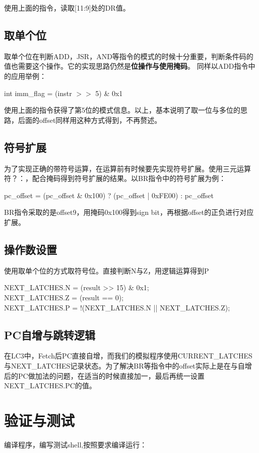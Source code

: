 \documentclass[UTF8]{ctexart}
\begin{document}
使用上面的指令，读取[11:9]处的DR值。

\subsection{取单个位}
取单个位在判断ADD，JSR，AND等指令的模式的时候十分重要，判断条件码的值也需要这个操作。它的实现思路仍然是\textbf{位操作与使用掩码}。
同样以ADD指令中的应用举例：

{\centering int imm\_flag = (instr $>>$ 5) \& 0x1 \par}

使用上面的指令获得了第5位的模式信息。以上，基本说明了取一位与多位的思路，后面的offset同样用这种方式得到，不再赘述。

\subsection{符号扩展}
为了实现正确的带符号运算，在运算前有时候要先实现符号扩展。使用三元运算符？：，配合掩码得到符号扩展的结果。以BR指令中的符号扩展为例：

{\centering  pc\_offset = (pc\_offset \& 0x100) ? (pc\_offset | 0xFE00) : pc\_offset \par}

BR指令采取的是offset9，用掩码0x100得到sign bit，再根据offset的正负进行对应扩展。

\subsection{操作数设置}
使用取单个位的方式取符号位。直接判断N与Z，用逻辑运算得到P
\begin{center}
          NEXT\_LATCHES.N = (result >> 15) \& 0x1;\\
      NEXT\_LATCHES.Z = (result == 0);\\
      NEXT\_LATCHES.P = !(NEXT\_LATCHES.N || NEXT\_LATCHES.Z);\\
\end{center}

\subsection{PC自增与跳转逻辑}
在LC3中，Fetch后PC直接自增，而我们的模拟程序使用CURRENT\_LATCHES与NEXT\_LATCHES记录状态。为了解决BR等指令中的offset实际上是在与自增后的PC做加法的问题，在适当的时候直接加一，最后再统一设置NEXT\_LATCHES.PC的值。


\section{验证与测试}
编译程序，编写测试shell,按照要求编译运行：
\end{document}
